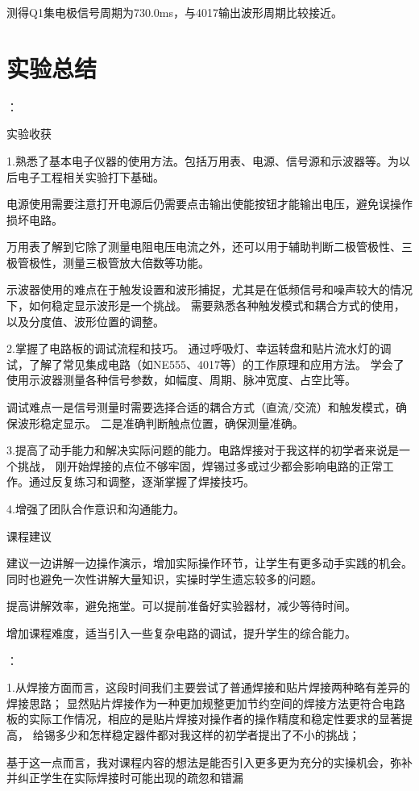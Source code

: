 \documentclass[12pt,a4paper]{article}
\begin{document}
测得Q1集电极信号周期为730.0ms，与4017输出波形周期比较接近。

\section{实验总结}

：

实验收获

1.熟悉了基本电子仪器的使用方法。包括万用表、电源、信号源和示波器等。为以后电子工程相关实验打下基础。

电源使用需要注意打开电源后仍需要点击输出使能按钮才能输出电压，避免误操作损坏电路。

万用表了解到它除了测量电阻电压电流之外，还可以用于辅助判断二极管极性、三极管极性，测量三极管放大倍数等功能。

示波器使用的难点在于触发设置和波形捕捉，尤其是在低频信号和噪声较大的情况下，如何稳定显示波形是一个挑战。
需要熟悉各种触发模式和耦合方式的使用，以及分度值、波形位置的调整。

2.掌握了电路板的调试流程和技巧。
通过呼吸灯、幸运转盘和贴片流水灯的调试，了解了常见集成电路（如NE555、4017等）的工作原理和应用方法。
学会了使用示波器测量各种信号参数，如幅度、周期、脉冲宽度、占空比等。

调试难点一是信号测量时需要选择合适的耦合方式（直流/交流）和触发模式，确保波形稳定显示。
二是准确判断触点位置，确保测量准确。

3.提高了动手能力和解决实际问题的能力。电路焊接对于我这样的初学者来说是一个挑战，
刚开始焊接的点位不够牢固，焊锡过多或过少都会影响电路的正常工作。通过反复练习和调整，逐渐掌握了焊接技巧。

4.增强了团队合作意识和沟通能力。

课程建议

建议一边讲解一边操作演示，增加实际操作环节，让学生有更多动手实践的机会。同时也避免一次性讲解大量知识，实操时学生遗忘较多的问题。

提高讲解效率，避免拖堂。可以提前准备好实验器材，减少等待时间。

增加课程难度，适当引入一些复杂电路的调试，提升学生的综合能力。



：

1.从焊接方面而言，这段时间我们主要尝试了普通焊接和贴片焊接两种略有差异的焊接思路；
显然贴片焊接作为一种更加规整更加节约空间的焊接方法更符合电路板的实际工作情况，相应的是贴片焊接对操作者的操作精度和稳定性要求的显著提高，
给锡多少和怎样稳定器件都对我这样的初学者提出了不小的挑战；

基于这一点而言，我对课程内容的想法是能否引入更多更为充分的实操机会，弥补并纠正学生在实际焊接时可能出现的疏忽和错漏
\end{document}
